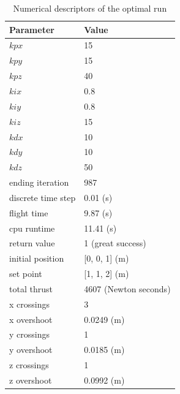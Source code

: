 \begin{table}
\label{table:optimalrun}
\begin{doublespace}
\centering
\begin{tabular}{l l}
Parameter    & Value\\
\hline
$kpx$                 & 15 \\
$kpy$                 & 15 \\
$kpz $                & 40 \\
$kix$                 & 0.8 \\
$kiy$                 & 0.8 \\
$kiz$                 & 15 \\
$kdx$                 & 10 \\
$kdy$                 & 10 \\
$kdz$                 & 50 \\
ending iteration    & 987 \\
discrete time step   & 0.01 (s)\\
flight time         & 9.87 (s) \\
cpu runtime         & 11.41 (s)\\
return value        & 1 (great success)\\
initial position    & [0, 0, 1] (m)\\
set point           & [1, 1, 2] (m) \\
total thrust        & 4607 (Newton seconds) \\
x crossings         & 3 \\
x overshoot         & 0.0249 (m) \\
y crossings         & 1 \\
y overshoot         & 0.0185 (m)\\
z crossings         & 1 \\
z overshoot         & 0.0992 (m) \\
\hline
\end{tabular}
\end{doublespace}

\caption[Optimal Run]{Numerical descriptors of the optimal run}
\end{table}

